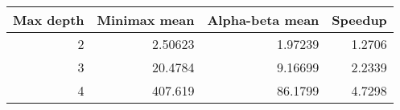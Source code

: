 \begin{tabular}{|r|r|r|r|}
\hline
   Max depth &   Minimax mean &   Alpha-beta mean &   Speedup
 \\
\hline
           2 &        2.50623 &           1.97239 &     1.2706 \\
           3 &       20.4784  &           9.16699 &     2.2339 \\
           4 &      407.619   &          86.1799  &     4.7298 \\
\hline
\end{tabular}
